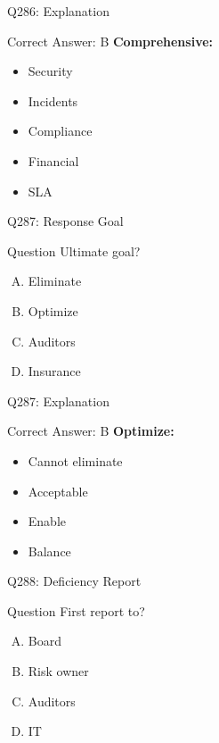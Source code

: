 \documentclass{beamer}
\begin{document}
	\begin{frame}{Q286: Explanation}
		\begin{block}{Correct Answer: B}
			\textbf{Comprehensive:}
			\begin{itemize}
				\item Security
				\item Incidents
				\item Compliance
				\item Financial
				\item SLA
			\end{itemize}
		\end{block}
	\end{frame}
	
	\begin{frame}{Q287: Response Goal}
		\begin{block}{Question}
			Ultimate goal?
		\end{block}
		\begin{enumerate}[(A)]
			\item Eliminate
			\item Optimize
			\item Auditors
			\item Insurance
		\end{enumerate}
	\end{frame}
	
	\begin{frame}{Q287: Explanation}
		\begin{block}{Correct Answer: B}
			\textbf{Optimize:}
			\begin{itemize}
				\item Cannot eliminate
				\item Acceptable
				\item Enable
				\item Balance
			\end{itemize}
		\end{block}
	\end{frame}
	
	\begin{frame}{Q288: Deficiency Report}
		\begin{block}{Question}
			First report to?
		\end{block}
		\begin{enumerate}[(A)]
			\item Board
			\item Risk owner
			\item Auditors
			\item IT
		\end{enumerate}
	\end{frame}
	
\end{document}
